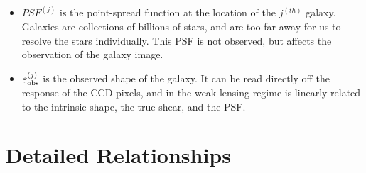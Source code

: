 \documentclass[12pt]{article}
\begin{document}
\begin{itemize}
  \item $PSF^{(j)}$ is the point-spread function at the location of the
    $j^{(th)}$ galaxy.  Galaxies are collections of billions of stars, and
    are too far away for us to resolve the stars individually.  This PSF
    is not observed, but affects the observation of the galaxy image.

  \item $\varepsilon^{(j)}_{\rm obs}$ is the observed shape of the galaxy.
    It can be read directly off the response of the CCD pixels, and
    in the weak lensing regime is linearly related to the intrinsic
    shape, the true shear, and the PSF.
\end{itemize}

\section{Detailed Relationships}
\label{sec:details}




%

\end{document}
